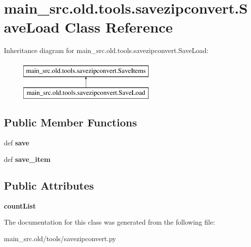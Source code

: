 \hypertarget{classmain__src_8old_1_1tools_1_1savezipconvert_1_1SaveLoad}{\section{main\-\_\-src.\-old.\-tools.\-savezipconvert.\-Save\-Load Class Reference}
\label{classmain__src_8old_1_1tools_1_1savezipconvert_1_1SaveLoad}
}
Inheritance diagram for main\-\_\-src.\-old.\-tools.\-savezipconvert.\-Save\-Load\-:\begin{figure}[H]
\begin{center}
\leavevmode
\includegraphics[height=2.000000cm]{classmain__src_8old_1_1tools_1_1savezipconvert_1_1SaveLoad}
\end{center}
\end{figure}
\subsection*{Public Member Functions}
\begin{DoxyCompactItemize}
\item 
\hypertarget{classmain__src_8old_1_1tools_1_1savezipconvert_1_1SaveLoad_a59fafa4b792eb1dde64f09c0978ca55f}{def {\bfseries save}}\label{classmain__src_8old_1_1tools_1_1savezipconvert_1_1SaveLoad_a59fafa4b792eb1dde64f09c0978ca55f}

\item 
\hypertarget{classmain__src_8old_1_1tools_1_1savezipconvert_1_1SaveLoad_a98341856ba220a57fec127c138707319}{def {\bfseries save\-\_\-item}}\label{classmain__src_8old_1_1tools_1_1savezipconvert_1_1SaveLoad_a98341856ba220a57fec127c138707319}

\end{DoxyCompactItemize}
\subsection*{Public Attributes}
\begin{DoxyCompactItemize}
\item 
\hypertarget{classmain__src_8old_1_1tools_1_1savezipconvert_1_1SaveLoad_a978bcf545cf8630f51da991b9acdffa9}{{\bfseries count\-List}}\label{classmain__src_8old_1_1tools_1_1savezipconvert_1_1SaveLoad_a978bcf545cf8630f51da991b9acdffa9}

\end{DoxyCompactItemize}


The documentation for this class was generated from the following file\-:\begin{DoxyCompactItemize}
\item 
main\-\_\-src.\-old/tools/savezipconvert.\-py\end{DoxyCompactItemize}

